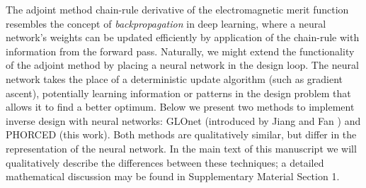 \documentclass{article}
\begin{document}
The adjoint method chain-rule derivative of the electromagnetic merit function resembles the concept of \textit{backpropagation} in deep learning, where a neural network's weights can be updated efficiently by application of the chain-rule with information from the forward pass. Naturally, we might extend the functionality of the adjoint method by placing a neural network in the design loop. The neural network takes the place of a deterministic update algorithm (such as gradient ascent), potentially learning information or patterns in the design problem that allows it to find a better optimum. Below we present two methods to implement inverse design with neural networks: GLOnet (introduced by Jiang and Fan \cite{jiang_global_2019,jiang_simulator-based_2020}) and PHORCED (this work). Both methods are qualitatively similar, but differ in the representation of the neural network. In the main text of this manuscript we will qualitatively describe the differences between these techniques; a detailed mathematical discussion may be found in Supplementary Material Section 1.
\end{document}

